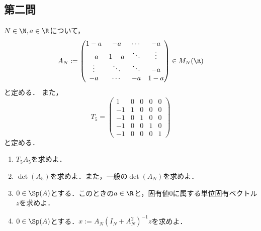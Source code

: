 \documentclass[uplatex,dvipdfmx]{jsarticle}
\begin{document}
\subsection{第二問}

\begin{tcolorbox}[colframe=ForestGreen, colback=ForestGreen!10!white,breakable,colbacktitle=ForestGreen!40!white,coltitle=black,fonttitle=\bfseries\sffamily,
    title=第２問]
    \begin{problem}\label{prob-19-1-2}
        $N\in\N,a\in\R$について，
        \[A_N:=\begin{pmatrix}
            1-a&-a&\cdots&-a\\
            -a&1-a&\ddots&\vdots\\
            \vdots&\ddots&\ddots&-a\\
            -a&\cdots&-a&1-a
        \end{pmatrix}\in M_N(\R)\]
        と定める．
        また，
        \[T_5=\begin{pmatrix}
            1&0&0&0&0\\
            -1&1&0&0&0\\
            -1&0&1&0&0\\
            -1&0&0&1&0\\
            -1&0&0&0&1
        \end{pmatrix}\]
        と定める．
        \begin{enumerate}
            \item $T_5A_5$を求めよ．
            \item $\det(A_5)$を求めよ．また，一般の$\det(A_N)$を求めよ．
            \item $0\in\Sp(A)$とする．このときの$a\in\R$と，固有値$0$に属する単位固有ベクトル$z$を求めよ．
            \item $0\in\Sp(A)$とする．$x:=A_N(I_N+A_N^2)^{-1}z$を求めよ．
        \end{enumerate}
    \end{problem}
\end{tcolorbox}
\end{document}
